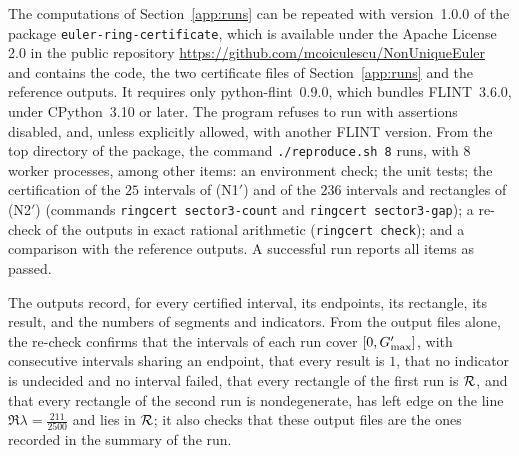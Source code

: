 The computations of Section~\ref{app:runs} can be repeated with version~1.0.0 of
the package \texttt{euler-ring-certificate}, which is available under the Apache
License 2.0 in the public repository \url{https://github.com/mcoiculescu/NonUniqueEuler}
and contains the code, the two
certificate files of Section~\ref{app:runs} and the reference outputs. It requires
only python-flint~0.9.0, which bundles FLINT~3.6.0, under CPython~3.10 or later.
The program refuses to run with assertions disabled, and, unless explicitly
allowed, with another FLINT version. From the top directory of the package, the
command \mbox{\texttt{./reproduce.sh 8}} runs, with $8$ worker processes, among other
items: an environment check; the unit tests; the certification of the $25$
intervals of \textup{(N1$'$)} and of the $236$ intervals and rectangles of
\textup{(N2$'$)} (commands \texttt{ringcert sector3-count} and
\texttt{ringcert sector3-gap}); a re-check of the outputs in exact rational
arithmetic (\texttt{ringcert check}); and a comparison with the reference
outputs. A successful run reports all items as passed.

The outputs record, for every certified interval, its endpoints, its rectangle,
its result, and the numbers of segments and indicators. From the output files
alone, the re-check confirms that the intervals of each run cover $[0,G_{\max}']$,
with consecutive intervals sharing an endpoint, that every result is $1$, that no
indicator is undecided and no interval failed, that every rectangle of the first
run is $\mathcal{R}$, and that every rectangle of the second run is nondegenerate, has
left edge on the line $\Re\lambda=\frac{211}{2500}$ and lies in $\mathcal{R}$; it also
checks that these output files are the ones recorded in the summary of the run.

